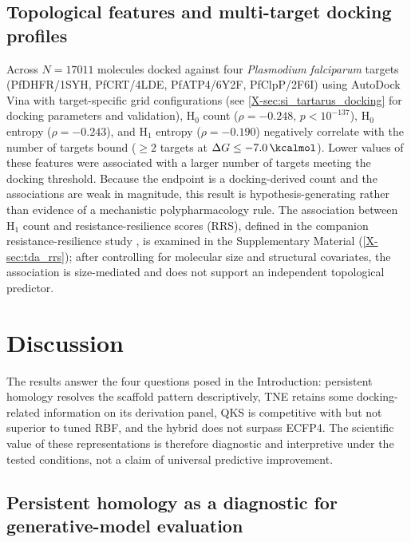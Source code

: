 \documentclass[11pt,a4paper]{article}
\begin{document}
\subsection{Topological features and multi-target docking profiles}
\label{sec:tda_promiscuity}

Across $N = \num{17011}$ molecules docked against four \textit{Plasmodium falciparum} targets (PfDHFR/1SYH, PfCRT/4LDE, PfATP4/6Y2F, PfClpP/2F6I) using AutoDock Vina with target-specific grid configurations (see \cref{X-sec:si_tartarus_docking} for docking parameters and validation), H$_0$ count ($\rho = -\num{0.248}$, $p < 10^{-137}$), H$_0$ entropy ($\rho = -\num{0.243}$), and H$_1$ entropy ($\rho = -\num{0.190}$) negatively correlate with the number of targets bound ($\geq 2$ targets at $\Delta G \leq -\SI{7.0}{\kcalmol}$). Lower values of these features were associated with a larger number of targets meeting the docking threshold. Because the endpoint is a docking-derived count and the associations are weak in magnitude, this result is hypothesis-generating rather than evidence of a mechanistic polypharmacology rule. The association between H$_1$ count and resistance-resilience scores (RRS), defined in the companion resistance-resilience study \citep{temgoua2026tb}, is examined in the Supplementary Material (\cref{X-sec:tda_rrs}); after controlling for molecular size and structural covariates, the association is size-mediated and does not support an independent topological predictor.


\section{Discussion}\label{sec:discussion}

The results answer the four questions posed in the Introduction: persistent homology resolves the scaffold pattern descriptively, TNE retains some docking-related information on its derivation panel, QKS is competitive with but not superior to tuned RBF, and the hybrid does not surpass ECFP4. The scientific value of these representations is therefore diagnostic and interpretive under the tested conditions, not a claim of universal predictive improvement.

\subsection{Persistent homology as a diagnostic for generative-model evaluation}
\end{document}
